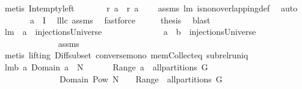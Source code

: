 \begin{isabellebody}
\ {\isacharparenleft}metis\ Int{\isacharunderscore}empty{\isacharunderscore}left{\isacharparenright}\isanewline
\ \ \isamarkupfalse%
\ \isamarkupfalse%
\ \isamarkupfalse%
\ {\isachardoublequoteopen}{\isacharquery}r\ a{}\ {\isasyminter}\ {\isacharparenleft}{\isacharquery}r\ a{}{\isacharparenright}\ {\isacharequal}\ {\isacharbraceleft}{\isacharbraceright}{\isachardoublequoteclose}\ \isamarkupfalse%
\ assms\ lm{}{}\ is{\isacharunderscore}non{\isacharunderscore}overlapping{\isacharunderscore}def\ \isamarkupfalse%
\ auto\isanewline
\ \ \isamarkupfalse%
\ \isamarkupfalse%
\ \isamarkupfalse%
\ {\isachardoublequoteopen}{\isacharquery}a\ {\isasymin}\ {\isacharquery}I{\isachardoublequoteclose}\ \isamarkupfalse%
\ lll{}{}c\ assms\ \isamarkupfalse%
\ fastforce\isanewline
\ \ \isamarkupfalse%
\ \isamarkupfalse%
\ {\isacharquery}thesis\ \isamarkupfalse%
\ blast\isanewline
{}\isamarkupfalse%
%
\endisatagproof
{\isafoldproof}%
%
\isadelimproof
\isanewline
%
\endisadelimproof
\isanewline
\isanewline
{}\isamarkupfalse%
\ lm{}{}{\isacharcolon}\ \ {\isachardoublequoteopen}a\ {\isasymin}\ injectionsUniverse{\isachardoublequoteclose}\ \isanewline
\ \ \ \ \ \ \ \ \ \ \ \ \ {\isachardoublequoteopen}a\ {\isacharminus}\ b\ {\isasymin}\ injectionsUniverse{\isachardoublequoteclose}\ \isanewline
%
\isadelimproof
\ \ \ \ \ \ \ \ \ \ \ \ %
\endisadelimproof
%
\isatagproof
{}\isamarkupfalse%
\ assms\ \isanewline
\ \ \ \ \ \ \ \ \ \ \ \ \isamarkupfalse%
\ {\isacharparenleft}metis\ {\isacharparenleft}lifting{\isacharparenright}\ Diff{\isacharunderscore}subset\ converse{\isacharunderscore}mono\ mem{\isacharunderscore}Collect{\isacharunderscore}eq\ subrel{\isacharunderscore}runiq{\isacharparenright}%
\endisatagproof
{\isafoldproof}%
%
\isadelimproof
\isanewline
%
\endisadelimproof
\isanewline
\isanewline
{}\isamarkupfalse%
\ lm{}{}b{\isacharcolon}\ {\isachardoublequoteopen}{\isacharbraceleft}a{\isachardot}\ Domain\ a\ {\isasymsubseteq}\ N\ \ \ \ {\isacharampersand}\ \ \ Range\ a\ {\isasymin}\ all{\isacharunderscore}partitions\ G{\isacharbraceright}\ {\isacharequal}\isanewline
\ \ \ \ \ \ \ \ \ \ \ \ \ \ {\isacharparenleft}Domain\ {\isacharminus}{\isacharbackquote}{\isacharparenleft}Pow\ N{\isacharparenright}{\isacharparenright}\ \ {\isasyminter}\ \ {\isacharparenleft}Range\ {\isacharminus}{\isacharbackquote}\ {\isacharparenleft}all{\isacharunderscore}partitions\ G{\isacharparenright}{\isacharparenright}\ {\isachardoublequoteclose}\ \isanewline

\end{isabellebody}
